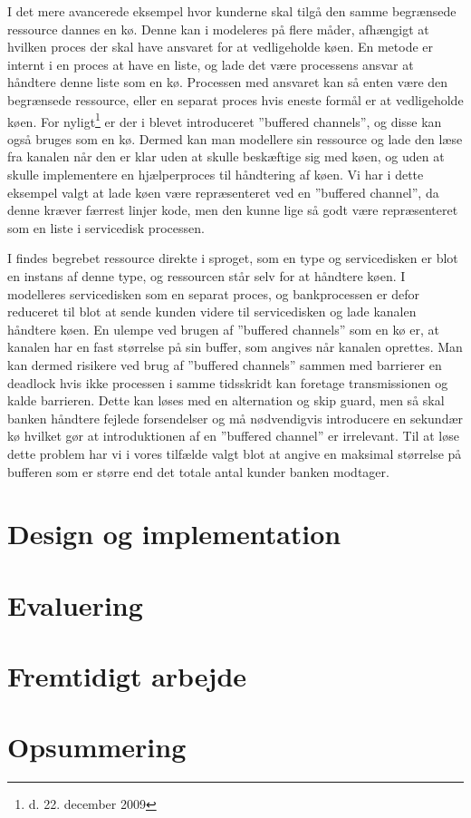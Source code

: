 I det mere avancerede eksempel hvor kunderne skal tilgå den samme begrænsede 
ressource dannes en kø. Denne kan i \pycsp modeleres på flere måder, afhængigt 
at hvilken proces der skal have ansvaret for at vedligeholde køen. En metode er 
internt i en proces at have en liste, og lade det være 
processens ansvar at håndtere denne liste som en kø. Processen med ansvaret kan 
så enten være den begrænsede ressource, eller en separat proces hvis eneste 
formål er at vedligeholde køen. For nyligt\footnote{d. 22. december 2009} er 
der i \pycsp blevet introduceret ''buffered channels''\cite{pycsp-r147}, og 
disse kan også bruges som en kø. Dermed kan man modellere sin ressource og lade 
den læse fra kanalen når den er klar uden at skulle beskæftige sig med køen, og 
uden at skulle implementere en hjælperproces til håndtering af køen. Vi har i 
dette eksempel valgt at lade køen være repræsenteret ved en ''buffered 
channel'', da denne  kræver færrest linjer kode, men den kunne lige så godt 
være repræsenteret som en liste i servicedisk processen.

I \simpy findes begrebet ressource direkte i sproget, som en type og 
servicedisken er blot en instans af denne type, og ressourcen står selv for at 
håndtere køen. I \pycsp modelleres servicedisken som en separat proces, og 
bankprocessen er defor reduceret til blot at sende kunden videre til 
servicedisken og lade kanalen håndtere køen. En ulempe ved brugen af ''buffered 
channels'' som en kø er, at kanalen har en fast størrelse på sin buffer, som 
angives når kanalen oprettes.  Man kan dermed risikere ved brug af ''buffered 
channels'' sammen med barrierer en deadlock hvis ikke processen i samme 
tidsskridt kan foretage transmissionen og kalde barrieren. 
Dette kan løses med en alternation og skip guard, men så 
skal banken håndtere fejlede forsendelser og må nødvendigvis introducere en 
sekundær kø hvilket gør at introduktionen af en ''buffered channel'' er 
irrelevant. Til at løse dette problem har vi i vores tilfælde valgt blot at 
angive en maksimal størrelse på bufferen som er større end det totale antal 
kunder banken modtager.

  \section{Design og implementation}
  \section{Evaluering}
  \section{Fremtidigt arbejde}
  \section{Opsummering}
